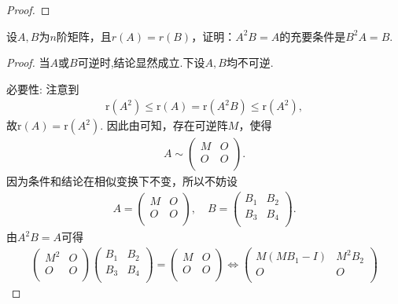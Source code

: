 \documentclass[../../main.tex]{subfiles}%
\begin{document}
\begin{proof}
\end{proof}

\begin{example}
设$A,B$为$n$阶矩阵，且$r(A)=r(B)$，证明：$A^2B = A$的充要条件是$B^2A = B$.
\end{example}
\begin{proof}

当$A$或$B$可逆时,结论显然成立.下设$A,B$均不可逆.

{\heiti 必要性:} 注意到
\begin{align*}
\mathrm{r}(A^2) \leqslant \mathrm{r}(A) = \mathrm{r}(A^2B) \leqslant \mathrm{r}(A^2),
\end{align*}
故\(\mathrm{r}(A) = \mathrm{r}(A^2)\). 因此由可知，存在可逆阵\(M\)，使得
\begin{align*}
A \sim \begin{pmatrix}
M&		O\\
O&		O\\
\end{pmatrix}.
\end{align*}
因为条件和结论在相似变换下不变，所以不妨设
\begin{align*}
A = \begin{pmatrix}
M&		O\\
O&		O\\
\end{pmatrix},\quad B = \begin{pmatrix}
B_1&		B_2\\
B_3&		B_4\\
\end{pmatrix}.
\end{align*}
由\(A^2B = A\)可得
\begin{align*}
\begin{pmatrix}
M^2&		O\\
O&		O\\
\end{pmatrix} \begin{pmatrix}
B_1&		B_2\\
B_3&		B_4\\
\end{pmatrix} = \begin{pmatrix}
M&		O\\
O&		O\\
\end{pmatrix} \Longleftrightarrow \begin{pmatrix}
M(MB_1 - I)&		M^2B_2\\
O&		O\\

\end{pmatrix}
\end{align*}
\end{proof}
\end{document}

